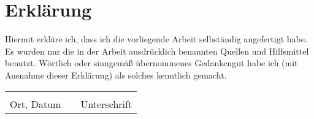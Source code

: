 
\section*{Erklärung}

Hiermit erkläre ich, dass ich die vorliegende Arbeit selbständig angefertigt habe. Es wurden nur die in der Arbeit ausdrücklich benannten Quellen und Hilfsmittel benutzt. Wörtlich oder sinngemäß übernommenes Gedankengut habe ich (mit Ausnahme dieser Erklärung) als solches kenntlich gemacht.
\vspace{4\baselineskip}

\begin{tabular}{lp{2em}l}
 \hspace{5cm}   && \hspace{4cm} \\
 \cline{1-1}\cline{3-3}
 Ort, Datum     && Unterschrift
\end{tabular} 